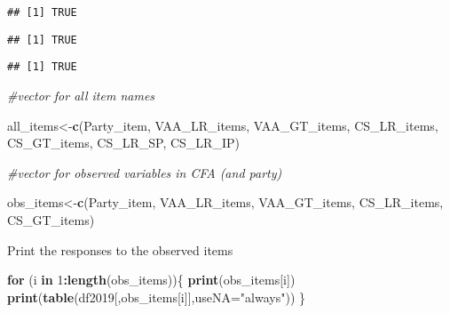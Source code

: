 \documentclass[
]{article}
\newenvironment{Shaded}{\begin{snugshade}}{\end{snugshade}}
\newcommand{\CommentTok}[1]{\textcolor[rgb]{0.56,0.35,0.01}{\textit{#1}}}
\newcommand{\ControlFlowTok}[1]{\textcolor[rgb]{0.13,0.29,0.53}{\textbf{#1}}}
\newcommand{\DataTypeTok}[1]{\textcolor[rgb]{0.13,0.29,0.53}{#1}}
\newcommand{\DecValTok}[1]{\textcolor[rgb]{0.00,0.00,0.81}{#1}}
\newcommand{\KeywordTok}[1]{\textcolor[rgb]{0.13,0.29,0.53}{\textbf{#1}}}
\newcommand{\NormalTok}[1]{#1}
\newcommand{\OperatorTok}[1]{\textcolor[rgb]{0.81,0.36,0.00}{\textbf{#1}}}
\newcommand{\StringTok}[1]{\textcolor[rgb]{0.31,0.60,0.02}{#1}}
\begin{document}
\begin{verbatim}
## [1] TRUE
\end{verbatim}

\begin{Shaded}
\end{Shaded}

\begin{verbatim}
## [1] TRUE
\end{verbatim}

\begin{Shaded}
\end{Shaded}

\begin{verbatim}
## [1] TRUE
\end{verbatim}

\begin{Shaded}
\begin{Highlighting}[]
\CommentTok{#vector for all item names}

\NormalTok{all_items<-}\KeywordTok{c}\NormalTok{(Party_item,}
\NormalTok{             VAA_LR_items,}
\NormalTok{             VAA_GT_items,}
\NormalTok{             CS_LR_items,}
\NormalTok{             CS_GT_items,}
\NormalTok{             CS_LR_SP,}
\NormalTok{             CS_LR_IP)}

\CommentTok{#vector for observed variables in CFA (and party)}

\NormalTok{obs_items<-}\KeywordTok{c}\NormalTok{(Party_item,}
\NormalTok{             VAA_LR_items,}
\NormalTok{             VAA_GT_items,}
\NormalTok{             CS_LR_items,}
\NormalTok{             CS_GT_items)}
\end{Highlighting}
\end{Shaded}

Print the responses to the observed items

\begin{Shaded}
\begin{Highlighting}[]
\ControlFlowTok{for}\NormalTok{ (i }\ControlFlowTok{in} \DecValTok{1}\OperatorTok{:}\KeywordTok{length}\NormalTok{(obs_items))\{}
  \KeywordTok{print}\NormalTok{(obs_items[i])}
  \KeywordTok{print}\NormalTok{(}\KeywordTok{table}\NormalTok{(df2019[,obs_items[i]],}\DataTypeTok{useNA=}\StringTok{"always"}\NormalTok{))}
\NormalTok{  \}}
\end{Highlighting}
\end{Shaded}
\end{document}
